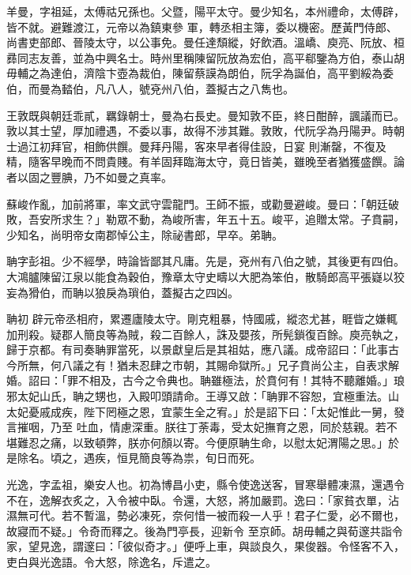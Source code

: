\begin{pinyinscope}
 羊曼，字祖延，太傅祜兄孫也。父暨，陽平太守。曼少知名，本州禮命，太傅辟，皆不就。避難渡江，元帝以為鎮東參
 軍，轉丞相主簿，委以機密。歷黃門侍郎、尚書吏部郎、晉陵太守，以公事免。曼任達頹縱，好飲酒。溫嶠、庾亮、阮放、桓彞同志友善，並為中興名士。時州里稱陳留阮放為宏伯，高平郗鑒為方伯，泰山胡毋輔之為達伯，濟陰卞壺為裁伯，陳留蔡謨為朗伯，阮孚為誕伯，高平劉綏為委伯，而曼為濌伯，凡八人，號兗州八伯，蓋擬古之八雋也。



 王敦既與朝廷乖貳，羈錄朝士，曼為右長史。曼知敦不臣，終日酣醉，諷議而已。敦以其士望，厚加禮遇，不委以事，故得不涉其難。敦敗，代阮孚為丹陽尹。時朝士過江初拜官，相飾供饌。曼拜丹陽，客來早者得佳設，日宴
 則漸罄，不復及精，隨客早晚而不問貴賤。有羊固拜臨海太守，竟日皆美，雖晚至者猶獲盛饌。論者以固之豐腆，乃不如曼之真率。



 蘇峻作亂，加前將軍，率文武守雲龍門。王師不振，或勸曼避峻。曼曰：「朝廷破敗，吾安所求生？」勒眾不動，為峻所害，年五十五。峻平，追贈太常。子賁嗣，少知名，尚明帝女南郡悼公主，除祕書郎，早卒。弟聃。



 聃字彭祖。少不經學，時論皆鄙其凡庸。先是，兗州有八伯之號，其後更有四伯。大鴻臚陳留江泉以能食為穀伯，豫章太守史疇以大肥為笨伯，散騎郎高平張嶷以狡妄為猾伯，而聃以狼戾為瑣伯，蓋擬古之四凶。



 聃初
 辟元帝丞相府，累遷廬陵太守。剛克粗暴，恃國戚，縱恣尤甚，睚眥之嫌輒加刑殺。疑郡人簡良等為賊，殺二百餘人，誅及嬰孩，所髡鎖復百餘。庾亮執之，歸于京都。有司奏聃罪當死，以景獻皇后是其祖姑，應八議。成帝詔曰：「此事古今所無，何八議之有！猶未忍肆之市朝，其賜命獄所。」兄子賁尚公主，自表求解婚。詔曰：「罪不相及，古今之令典也。聃雖極法，於賁何有！其特不聽離婚。」琅邪太妃山氏，聃之甥也，入殿叩頭請命。王導又啟：「聃罪不容恕，宜極重法。山太妃憂戚成疾，陛下罔極之恩，宜蒙生全之宥。」於是詔下曰：「太妃惟此一舅，發言摧咽，乃至
 吐血，情慮深重。朕往丁荼毒，受太妃撫育之恩，同於慈親。若不堪難忍之痛，以致頓弊，朕亦何顏以寄。今便原聃生命，以慰太妃渭陽之思。」於是除名。頃之，遇疾，恒見簡良等為祟，旬日而死。



 光逸，字孟祖，樂安人也。初為博昌小吏，縣令使逸送客，冒寒舉體凍濕，還遇令不在，逸解衣炙之，入令被中臥。令還，大怒，將加嚴罰。逸曰：「家貧衣單，沾濕無可代。若不暫溫，勢必凍死，奈何惜一被而殺一人乎！君子仁愛，必不爾也，故寢而不疑。」令奇而釋之。後為門亭長，迎新令
 至京師。胡毋輔之與荀邃共詣令家，望見逸，謂邃曰：「彼似奇才。」便呼上車，與談良久，果俊器。令怪客不入，吏白與光逸語。令大怒，除逸名，斥遣之。




\end{pinyinscope}
